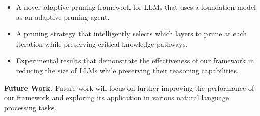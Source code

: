 \documentclass{article}
\begin{document}
        \begin{itemize}
        \item A novel adaptive pruning framework for LLMs that uses a foundation model as an adaptive pruning agent.
        \item A pruning strategy that intelligently selects which layers to prune at each iteration while preserving critical knowledge pathways.
        \item Experimental results that demonstrate the effectiveness of our framework in reducing the size of LLMs while preserving their reasoning capabilities.
        \end{itemize}

        \vspace{1cm}
        \large
        \textbf{Future Work.} Future work will focus on further improving the performance of our framework and exploring its application in various natural language processing tasks.

        
\end{document}

